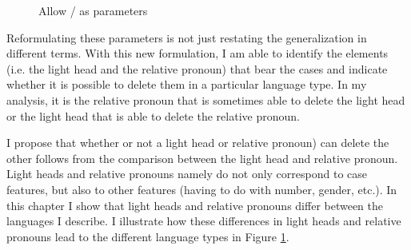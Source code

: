\begin{figure}[H]
  \centering
    \footnotesize{
    }
    \caption{Allow / as parameters}
    \label{fig:two-parameters-different}
\end{figure}

Reformulating these parameters is not just restating the generalization in different terms. With this new formulation, I am able to identify the elements (i.e. the light head and the relative pronoun) that bear the cases and indicate whether it is possible to delete them in a particular language type. In my analysis, it is the relative pronoun that is sometimes able to delete the light head or the light head that is able to delete the relative pronoun.

I propose that whether or not a light head or relative pronoun) can delete the other follows from the comparison between the light head and relative pronoun. Light heads and relative pronouns namely do not only correspond to case features, but also to other features (having to do with number, gender, etc.). In this chapter I show that light heads and relative pronouns differ between the languages I describe. I illustrate how these differences in light heads and relative pronouns lead to the different language types in Figure \ref{fig:two-parameters-different}.


